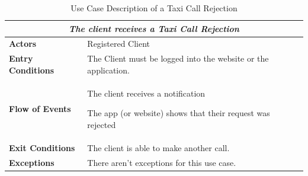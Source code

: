 \documentclass[a4paper]{article}
\begin{document}
\begin{table} [H]
\begin{center}
\begin{tabular}{ |m{}|m{}|  }
\hline
    \multicolumn{2}{|c|}{\textbf{\textit{The client receives a Taxi Call Rejection}}} \\
\hline \hline
    \textbf{Actors}
&   Registered Client
\\ \hline
    \textbf{Entry Conditions}
&   The Client must be logged into the website or the application.
\\ \hline
    \textbf{Flow of Events}
& 
    \begin{enumerate*}
    \item The client receives a notification
    \item The app (or website) shows that their request was rejected
    \end{enumerate*}
\\ \hline
    \textbf{Exit Conditions}
&   The client is able to make another call.
\\ \hline
    \textbf{Exceptions}
&   
    There aren't exceptions for this use case.
\\ \hline
\end{tabular}
\end{center}
\caption{Use Case Description of a Taxi Call Rejection}
\label{table:clientrejection}
\end{table}
\end{document}
